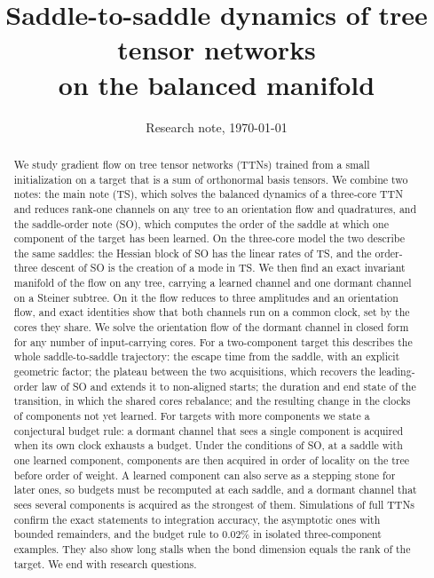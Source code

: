 \documentclass[11pt]{article}
\title{Saddle-to-saddle dynamics of tree tensor networks\\ on the balanced manifold}
\author{}
\date{Research note, \today}
\newcommand{\TS}{\textsf{TS}}
\newcommand{\SO}{\textsf{SO}}
\theoremstyle{definition}
\numberwithin{equation}{section}
\begin{document}
\maketitle

\begin{abstract}
We study gradient flow on tree tensor networks (TTNs) trained from a small initialization on a target that is a sum of orthonormal basis tensors. We combine two notes: the main note (\TS), which solves the balanced dynamics of a three-core TTN and reduces rank-one channels on any tree to an orientation flow and quadratures, and the saddle-order note (\SO), which computes the order of the saddle at which one component of the target has been learned. On the three-core model the two describe the same saddles: the Hessian block of \SO{} has the linear rates of \TS, and the order-three descent of \SO{} is the creation of a mode in \TS. We then find an exact invariant manifold of the flow on any tree, carrying a learned channel and one dormant channel on a Steiner subtree. On it the flow reduces to three amplitudes and an orientation flow, and exact identities show that both channels run on a common clock, set by the cores they share. We solve the orientation flow of the dormant channel in closed form for any number of input-carrying cores. For a two-component target this describes the whole saddle-to-saddle trajectory: the escape time from the saddle, with an explicit geometric factor; the plateau between the two acquisitions, which recovers the leading-order law of \SO{} and extends it to non-aligned starts; the duration and end state of the transition, in which the shared cores rebalance; and the resulting change in the clocks of components not yet learned. For targets with more components we state a conjectural budget rule: a dormant channel that sees a single component is acquired when its own clock exhausts a budget. Under the conditions of \SO, at a saddle with one learned component, components are then acquired in order of locality on the tree before order of weight. A learned component can also serve as a stepping stone for later ones, so budgets must be recomputed at each saddle, and a dormant channel that sees several components is acquired as the strongest of them. Simulations of full TTNs confirm the exact statements to integration accuracy, the asymptotic ones with bounded remainders, and the budget rule to $0.02\%$ in isolated three-component examples. They also show long stalls when the bond dimension equals the rank of the target. We end with research questions.
\end{abstract}
\end{document}
